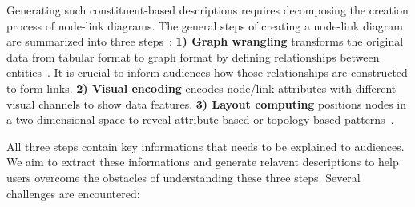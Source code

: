 Generating such constituent-based descriptions requires decomposing the creation process of node-link diagrams.
The general steps of creating a node-link diagram are summarized into three steps~\cite{DBLP:journals/cgf/SpritzerBDFF15, tvcg/RomatAP21}:
\textbf{1) Graph wrangling} transforms the original data from tabular format to graph format by defining relationships between entities~\cite{DBLP:journals/tvcg/SrinivasanPEB18, DBLP:conf/ieeevast/BigelowNML19, DBLP:journals/ivs/HeerP14, DBLP:journals/ivs/LiuNS14}.
It is crucial to inform audiences how those relationships are constructed to form links.
\textbf{2) Visual encoding} encodes node/link attributes with different visual channels to show data features. 
\textbf{3) Layout computing} positions nodes in a two-dimensional space to reveal attribute-based or topology-based patterns~\cite{DBLP:journals/cgf/NobreMSL19}.

All three steps contain key informations that needs to be explained to audiences.
We aim to extract these informations and generate relavent descriptions to help users overcome the obstacles of understanding these three steps.
Several challenges are encountered:

